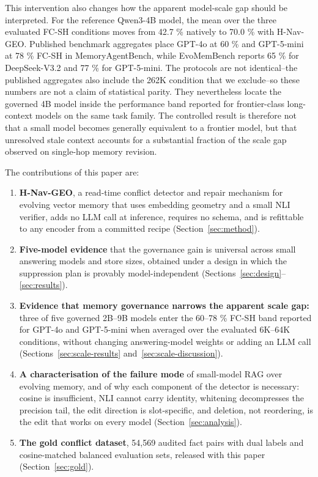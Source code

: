 \documentclass[journal=jcisd8,manuscript=article]{achemso}
\begin{document}
This intervention also changes how the apparent model-scale gap should be interpreted. For the reference Qwen3-4B model, the mean over the three evaluated FC-SH conditions moves from 42.7 \% natively to 70.0 \% with H-Nav-GEO. Published benchmark aggregates place GPT-4o at 60 \% and GPT-5-mini at 78 \% FC-SH in MemoryAgentBench, while EvoMemBench reports 65 \% for DeepSeek-V3.2 and 77 \% for GPT-5-mini. The protocols are not identical--the published aggregates also include the 262K condition that we exclude--so these numbers are not a claim of statistical parity. They nevertheless locate the governed 4B model inside the performance band reported for frontier-class long-context models on the same task family. The controlled result is therefore not that a small model becomes generally equivalent to a frontier model, but that unresolved stale context accounts for a substantial fraction of the scale gap observed on single-hop memory revision.

The contributions of this paper are:
\begin{enumerate}
  \item \textbf{H-Nav-GEO}, a read-time conflict detector and repair mechanism for evolving vector memory that uses embedding geometry and a small NLI verifier, adds no LLM call at inference, requires no schema, and is refittable to any encoder from a committed recipe (Section~\ref{sec:method}).
  \item \textbf{Five-model evidence} that the governance gain is universal across small answering models and store sizes, obtained under a design in which the suppression plan is provably model-independent (Sections~\ref{sec:design}--\ref{sec:results}).
  \item \textbf{Evidence that memory governance narrows the apparent scale gap:} three of five    governed 2B--9B models enter the 60--78 \% FC-SH band reported for GPT-4o and    GPT-5-mini when averaged over the evaluated 6K--64K conditions, without changing    answering-model weights or adding an LLM call (Sections~\ref{sec:scale-results} and~\ref{sec:scale-discussion}).
  \item \textbf{A characterisation of the failure mode} of small-model RAG over evolving memory, and of why each component of the detector is necessary: cosine is insufficient, NLI cannot carry identity, whitening decompresses the precision tail, the edit direction is slot-specific, and deletion, not reordering, is the edit that works on every model (Section~\ref{sec:analysis}).
  \item \textbf{The gold conflict dataset}, 54,569 audited fact pairs with dual labels and cosine-matched balanced evaluation sets, released with this paper (Section~\ref{sec:gold}).
\end{enumerate}
\end{document}

